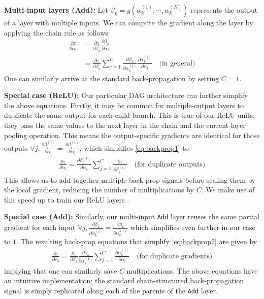 \documentclass[10pt,twocolumn,letterpaper]{article}
\begin{document}
{\bf Multi-input layers (Add):} Let $\beta_k=g(\alpha^{(1)}_k,\cdots,\alpha^{(N)}_k)$ represents the output of a layer with multiple inputs. We can compute the gradient along the layer by applying the chain rule as follows:
\vspace{-5pt}
\begin{align}
\frac{\partial z}{\partial \alpha_i}&=\frac{\partial z}{\partial \beta_k}\frac{\partial \beta_k}{\partial \alpha_i} \nonumber \\
&=\frac{\partial z}{\partial \beta_k}\sum_{j=1}^{C}\frac{\partial \beta_k}{\partial \alpha_k^{(j)}}\frac{\partial \alpha_k^{(j)}}{\partial \alpha_i} \quad \text{(in general)} \label{eq:backprop2}
\end{align} 
One can similarly arrive at the standard back-propagation by setting $C=1$.


{\bf Special case (ReLU):} Our particular DAG architecture can further simplify the above equations. Firstly, it may be common for multiple-output layers to duplicate the same output for each child branch. This is true of our ReLU units; they pass the same values to the next layer in the chain and the current-layer pooling operation. This means the output-specific gradients are identical for those outputs $\forall j, \frac{\partial \beta_i^{(j)}}{\partial \alpha_i} =  \frac{\partial \beta_i^{(1)}}{\partial \alpha_i}$, which simplifies \eqref{eq:backprop1} to
\vspace{-5pt}
\begin{align}
\frac{\partial z}{\partial \alpha_i} = \frac{\partial \beta_i^{(1)}}{\partial \alpha_i} \sum_{j=1}^{C}\frac{\partial z}{\partial \beta_i^{(j)}} \quad \text{(for duplicate outputs)}
\end{align}
This allows us to add together multiple back-prop signals before scaling them by the local gradient, reducing 
the number of multiplications by $C$. We make use of this speed up to train our ReLU layers
. 

{\bf Special case (Add):} Similarly, our multi-input {\tt Add} layer reuses the same partial gradient for each input
$\forall j, \frac{\partial \beta_k}{\partial \alpha_k^{(j)}} = \frac{\partial \beta_k}{\partial \alpha_k^{(1)}}$ which simplifies even further in our case to $1$. The resulting back-prop equations that simplify \eqref{eq:backprop2} are given by
\vspace{-5pt}
\begin{align}
\frac{\partial z}{\partial \alpha_i} = \frac{\partial z}{\partial \beta_k} \frac{\partial \beta_k}{\partial \alpha_k^{(1)}}\sum_{j=1}^{C} \frac{\partial \alpha_k^{(j)}}{\partial \alpha_i}  \quad \text{(for duplicate gradients)}
\end{align}
\noindent implying that one can similarly save $C$ multiplications. The above equations have an intuitive implementation; the standard chain-structured back-propagation signal is simply replicated along each of the parents of the {\tt Add} layer.
\end{document}
